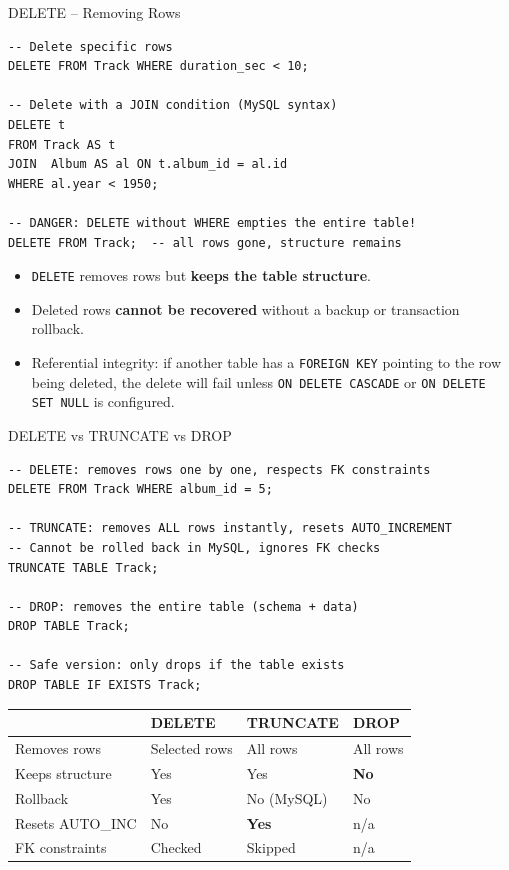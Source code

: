 \begin{frame}[fragile]{DELETE -- Removing Rows}
  \begin{lstlisting}[style=sqlstyle]
-- Delete specific rows
DELETE FROM Track WHERE duration_sec < 10;

-- Delete with a JOIN condition (MySQL syntax)
DELETE t
FROM Track AS t
JOIN  Album AS al ON t.album_id = al.id
WHERE al.year < 1950;

-- DANGER: DELETE without WHERE empties the entire table!
DELETE FROM Track;  -- all rows gone, structure remains
  \end{lstlisting}

  \begin{itemize}
    \item \texttt{DELETE} removes rows but \textbf{keeps the table structure}.
    \item Deleted rows \textbf{cannot be recovered} without a backup or transaction rollback.
    \item Referential integrity: if another table has a \texttt{FOREIGN KEY} pointing to the row
          being deleted, the delete will fail unless \texttt{ON DELETE CASCADE} or
          \texttt{ON DELETE SET NULL} is configured.
  \end{itemize}
\end{frame}

\begin{frame}[fragile]{DELETE vs TRUNCATE vs DROP}
  \begin{lstlisting}[style=sqlstyle]
-- DELETE: removes rows one by one, respects FK constraints
DELETE FROM Track WHERE album_id = 5;

-- TRUNCATE: removes ALL rows instantly, resets AUTO_INCREMENT
-- Cannot be rolled back in MySQL, ignores FK checks
TRUNCATE TABLE Track;

-- DROP: removes the entire table (schema + data)
DROP TABLE Track;

-- Safe version: only drops if the table exists
DROP TABLE IF EXISTS Track;
  \end{lstlisting}

  \begin{center}
  \renewcommand{\arraystretch}{1.2}
  \begin{tabular}{@{}llll@{}}
    \toprule
    & \textbf{DELETE} & \textbf{TRUNCATE} & \textbf{DROP} \\
    \midrule
    Removes rows     & Selected rows & All rows & All rows \\
    Keeps structure  & Yes & Yes & \textbf{No} \\
    Rollback         & Yes & No (MySQL) & No \\
    Resets AUTO\_INC & No  & \textbf{Yes} & n/a \\
    FK constraints   & Checked & Skipped & n/a \\
    \bottomrule
  \end{tabular}
  \end{center}
\end{frame}

